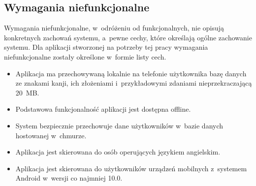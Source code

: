 \documentclass[a4paper,twoside,12pt]{book}
\begin{document}
\subsection{Wymagania niefunkcjonalne}
Wymagania niefunkcjonalne, w~odróżeniu od funkcjonalnych, nie opisują konkretnych zachowań systemu, a~pewne cechy, które określają ogólne zachowanie systemu. Dla aplikacji stworzonej na potrzeby tej pracy wymagania niefunkcjonalne zostały określone w~formie listy cech. 
\begin{itemize}
\item Aplikacja ma przechowywaną lokalnie na telefonie użytkownika bazę danych ze znakami kanji, ich złożeniami i~przykładowymi zdaniami nieprzekraczającą 20~MB. 
\item Podstawowa funkcjonalność aplikacji jest dostępna offline.
\item System bezpiecznie przechowuje dane użytkowników w~bazie danych hostowanej w~chmurze.
\item Aplikacja jest skierowana do osób operujących językiem angielskim.
\item Aplikacja jest skierowana do użytkowników urządzeń mobilnych z~systemem Android w~wersji co najmniej 10.0.
\end{itemize}
    
\end{document}
